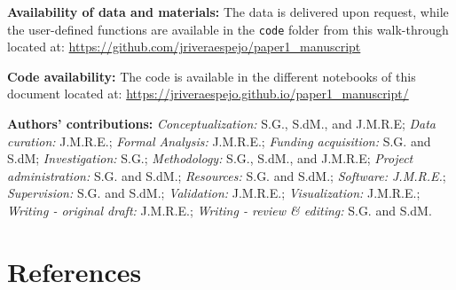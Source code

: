 \documentclass[
]{agujournal2019}
\begin{document}
\textbf{Availability of data and materials:} The data is delivered upon
request, while the user-defined functions are available in the
\texttt{code} folder from this walk-through located at:
\url{https://github.com/jriveraespejo/paper1_manuscript}

\textbf{Code availability:} The code is available in the different
notebooks of this document located at:
\url{https://jriveraespejo.github.io/paper1_manuscript/}

\textbf{Authors' contributions:} \emph{Conceptualization:} S.G., S.dM.,
and J.M.R.E; \emph{Data curation:} J.M.R.E.; \emph{Formal Analysis:}
J.M.R.E.; \emph{Funding acquisition:} S.G. and S.dM;
\emph{Investigation:} S.G.; \emph{Methodology:} S.G., S.dM., and
J.M.R.E; \emph{Project administration:} S.G. and S.dM.;
\emph{Resources:} S.G. and S.dM.; \emph{Software: J.M.R.E.};
\emph{Supervision:} S.G. and S.dM.; \emph{Validation:} J.M.R.E.;
\emph{Visualization:} J.M.R.E.; \emph{Writing - original draft:}
J.M.R.E.; \emph{Writing - review \& editing:} S.G. and S.dM.

\newpage{}

\section*{References}\label{references}
\end{document}
